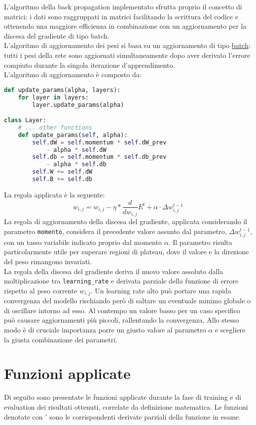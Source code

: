 L'algoritmo della back propagation implementato sfrutta proprio il concetto di matrici: i dati sono raggruppati in matrici facilitando la scrittura del codice e ottenendo una maggiore efficienza in combinazione con un aggiornamento per la discesa del gradiente di tipo batch.\\
L'algoritmo di aggiornamento dei pesi si basa su un aggiornamento di tipo \underline{batch}: tutti i pesi della rete sono aggiornati simultaneamente dopo aver derivato l'errore compiuto durante la singola iterazione d'apprendimento.\\
L'algoritmo di aggiornamento è composto da:
\begin{lstlisting}[language=Python]
def update_params(alpha, layers):
    for layer in layers:
        layer.update_params(alpha)

class Layer:
    # ... other functions
    def update_params(self, alpha):
        self.dW = self.momentum * self.dW_prev
            - alpha * self.dW
        self.db = self.momentum * self.db_prev 
            - alpha * self.db
        self.W += self.dW
        self.B += self.db
\end{lstlisting}
La regola applicata è la seguente:
\begin{equation}
w_{i,j} = w_{i,j} -  \eta * \frac{d}{dw_{i,j}}E^t + \alpha \cdot \Delta w_{i,j}^{t-1}
\end{equation}
La regola di aggiornamento della discesa del gradiente, applicata considerando il parametro \texttt{momento}, considera il precedente valore assunto dal parametro, $\Delta w_{i,j}^{t-1}$, con un tasso variabile indicato proprio dal momento $\alpha$. Il parametro risulta particolarmente utile per superare regioni di plateau, dove il valore e la direzione del peso rimangono invariati.  \\
La regola della discesa del gradiente deriva il nuovo valore assoluto dalla moltiplicazione tra \texttt{learning\_rate} e derivata parziale della funzione di errore rispetto al peso corrente $w_{i,j}$. Un learning rate alto può portare una rapida convergenza del modello rischiando però di saltare un eventuale minimo globale o di oscillare intorno ad esso. Al contempo un valore basso per un caso specifico può causare aggiornamenti più piccoli, rallentando la convergenza. Allo stesso modo è di cruciale importanza porre un giusto valore al parametro $\alpha$ e scegliere la giusta combinazione dei parametri.

\section{Funzioni applicate}
Di seguito sono presentate le funzioni applicate durante la fase di training e di evaluation dei risultati ottenuti, correlate da definizione matematica. Le funzioni denotate con $'$ sono le corrispondenti derivate parziali della funzione in esame.
